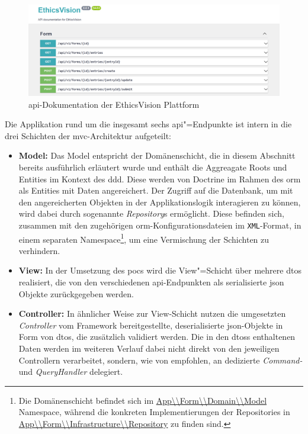 \documentclass[a4paper,12pt,twoside,numbers=noendperiod]{scrreprt}
\begin{document}
\begin{figure}[ht]
    \centering
    \includegraphics[width=\linewidth]{thesis/images/Luidold_EthicsVision-API-Docs.png}
    \caption{\acs{api}-Dokumentation der EthicsVision Plattform}
    \label{fig:ethics-vision-api-docs}
\end{figure}

Die Applikation rund um die insgesamt sechs \ac{api}"=Endpunkte ist intern in die drei Schichten der \ac{mvc}-Architektur aufgeteilt:
\begin{itemize}
    \item \textbf{Model:} Das Model entspricht der Domänenschicht, die in diesem Abschnitt bereits ausführlich erläutert wurde und enthält die Aggreagate Roots und Entities im Kontext des \ac{ddd}. Diese werden von Doctrine im Rahmen des \ac{orm} als Entities mit Daten angereichert. Der Zugriff auf die Datenbank, um mit den angereicherten Objekten in der Applikationslogik interagieren zu können, wird dabei durch sogenannte \textit{Repository}s ermöglicht. Diese befinden sich, zusammen mit den zugehörigen \ac{orm}-Konfigurationsdateien im \texttt{XML}-Format, in einem separaten Namespace\footnote{Die Domänenschicht befindet sich im \url{App\\Form\\Domain\\Model} Namespace, während die konkreten Implementierungen der Repositories in \url{App\\Form\\Infrastructure\\Repository} zu finden sind.}, um eine Vermischung der Schichten zu verhindern.
    \item \textbf{View:} In der Umsetzung des \aclp{poc} wird die View"=Schicht über mehrere \acp{dto} realisiert, die von den verschiedenen \ac{api}-Endpunkten als serialisierte \ac{json} Objekte zurückgegeben werden.
    \item \textbf{Controller:} In ähnlicher Weise zur View-Schicht nutzen die umgesetzten \textit{Controller} vom Framework bereitgestellte, deserialisierte \ac{json}-Objekte in Form von \ac{dto}s, die zusätzlich validiert werden. Die in den \acp{dto}s enthaltenen Daten werden im weiteren Verlauf dabei nicht direkt von den jeweiligen Controllern verarbeitet, sondern, wie von \cite{symfony_sas_best-practices_2023} empfohlen, an dedizierte \textit{Command-} und \textit{QueryHandler} delegiert.
\end{itemize}
\end{document}
